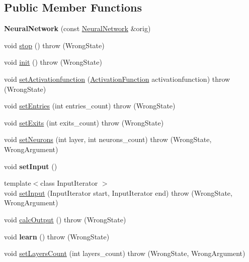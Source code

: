 \subsection*{\-Public \-Member \-Functions}
\begin{DoxyCompactItemize}
\item 
\hypertarget{class_neural_network_a4ce7e819f755461926a92668aab811e2}{{\bfseries \-Neural\-Network} (const \hyperlink{class_neural_network}{\-Neural\-Network} \&orig)}\label{class_neural_network_a4ce7e819f755461926a92668aab811e2}

\item 
void \hyperlink{class_neural_network_aaf6e7c89c53dcc4f4b2c71f8d25a9741}{stop} ()  throw (\-Wrong\-State)
\item 
void \hyperlink{class_neural_network_aa83131836c86cd3e60ddb46a17b164a5}{init} ()  throw (\-Wrong\-State)
\item 
void \hyperlink{class_neural_network_acfdd9905e047fff1b40e4cd358160f6e}{set\-Activationfunction} (\hyperlink{class_activation_function}{\-Activation\-Function} activationfunction)  throw (\-Wrong\-State)
\item 
void \hyperlink{class_neural_network_a705286b62e4d1d11310f997dadd31fa8}{set\-Entries} (int entries\-\_\-count)  throw (\-Wrong\-State)
\item 
void \hyperlink{class_neural_network_a18912fbb8068bfb301d6e2462c9f8a31}{set\-Exits} (int exits\-\_\-count)  throw (\-Wrong\-State)
\item 
void \hyperlink{class_neural_network_ab3c70e006390624a5b9bd2c933b8af56}{set\-Neurons} (int layer, int neurons\-\_\-count)  throw (\-Wrong\-State, Wrong\-Argument)
\item 
\hypertarget{class_neural_network_af38649b96a0f8004a72b2d224bb5e18a}{void {\bfseries set\-Input} ()}\label{class_neural_network_af38649b96a0f8004a72b2d224bb5e18a}

\item 
{\footnotesize template$<$class Input\-Iterator $>$ }\\void \hyperlink{class_neural_network_aaf64536a908b15b76faa8e19216d9219}{set\-Input} (\-Input\-Iterator start, \-Input\-Iterator end)  throw (\-Wrong\-State, Wrong\-Argument)
\item 
void \hyperlink{class_neural_network_a7f03c156227f54548f92ea1cd686a7da}{calc\-Output} ()  throw (\-Wrong\-State)
\item 
\hypertarget{class_neural_network_a88c90e7bb7cfe85fb4f22bd4fbb2fe51}{void {\bfseries learn} ()  throw (\-Wrong\-State)}\label{class_neural_network_a88c90e7bb7cfe85fb4f22bd4fbb2fe51}

\item 
void \hyperlink{class_neural_network_a3ef0490ade6f9efff49501132a12fd18}{set\-Layers\-Count} (int layers\-\_\-count)  throw (\-Wrong\-State, Wrong\-Argument)
\end{DoxyCompactItemize}


